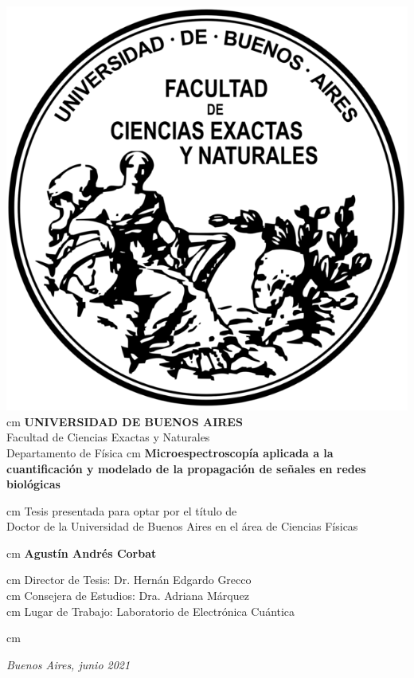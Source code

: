 \begin{titlepage}


\begin{center}
\includegraphics[width=5.cm]{./img/logos/Logo-fcenuba.png}
 cm
{\bf  \large UNIVERSIDAD DE BUENOS AIRES}\\
{\large  Facultad de Ciencias Exactas y Naturales}\\
{\large  Departamento de Física}
 cm
{\bf \Large  Microespectroscopía aplicada a la cuantificación y modelado de la propagación de señales en redes biológicas\\}

 cm
{Tesis presentada para optar por el título de \\
Doctor de la Universidad de Buenos Aires en el área de Ciencias Físicas}

 cm
{\bf \Large Agustín Andrés Corbat}

 cm
{Director de Tesis: Dr. Hernán Edgardo Grecco}\\
 cm
{Consejera de Estudios: Dra. Adriana Márquez}\\
 cm
{Lugar de Trabajo: Laboratorio de Electrónica Cuántica }

 cm
\end{center}
{\em Buenos Aires, junio 2021}

\vfill



\end{titlepage}

\cleardoublepage